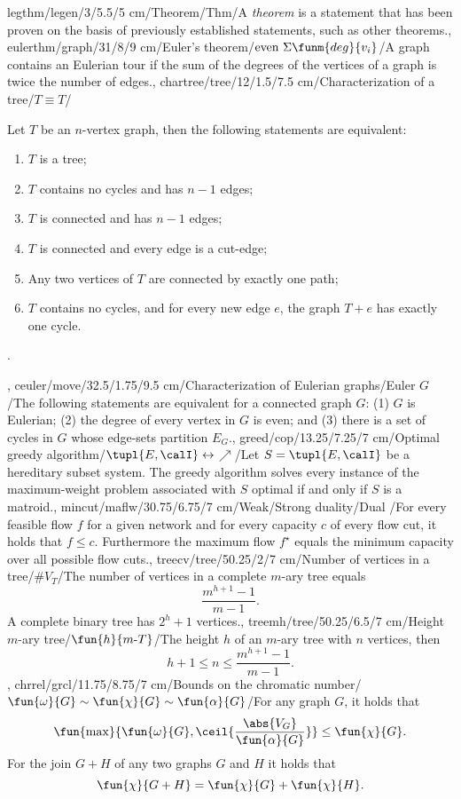 legthm/legen/3/5.5/5 cm/Theorem/Thm/{A \emph{theorem} is a statement that has been proven on the basis of previously established statements, such as other theorems.},
eulerthm/graph/31/8/9 cm/{Euler's theorem}/$\mbox{even}\ \Sigma{\funm{deg}{v_i}}$/{A graph contains an Eulerian tour if the sum of the degrees of the vertices of a graph is twice the number of edges.},
chartree/tree/12/1.5/7.5 cm/{Characterization of a tree}/{$T\equiv T$}/{Let $T$ be an $n$-vertex graph, then the following statements are equivalent:\begin{enumerate}\item $T$ is a tree; \item $T$ contains no cycles and has $n-1$ edges; \item $T$ is connected and has $n-1$ edges; \item $T$ is connected and every edge is a cut-edge; \item Any two vertices of $T$ are connected by exactly one path; \item $T$ contains no cycles, and for every new edge $e$, the graph $T+e$ has exactly one cycle.\end{enumerate}.},
ceuler/move/32.5/1.75/9.5 cm/{Characterization of Eulerian graphs}/{Euler $G$}/{The following statements are equivalent for a connected graph $G$: (1) $G$ is Eulerian; (2) the degree of every vertex in $G$ is even; and (3) there is a set of cycles in $G$ whose edge-sets partition $E_G$.},
greed/cop/13.25/7.25/7 cm/{Optimal greedy algorithm}/{$\tupl{E,\calI}\leftrightarrow$\textdollaroldstyle$\nearrow$}/{Let $S=\tupl{E,\calI}$ be a hereditary subset system. The greedy algorithm solves every instance of the maximum-weight problem associated with $S$ optimal if and only if $S$ is a matroid.},
mincut/maflw/30.75/6.75/7 cm/{Weak/Strong duality}/{Dual \watertap}/{For every feasible flow $f$ for a given network and for every capacity $c$ of every flow cut, it holds that $f\leq c$. Furthermore the maximum flow $f^{\star}$ equals the minimum capacity over all possible flow cuts.},
treecv/tree/50.25/2/7 cm/{Number of vertices in a tree}/{$\#V_T$}/{The number of vertices in a complete $m$-ary tree equals\[\dfrac{m^{h+1}-1}{m-1}.\] A complete binary tree has $2^h+1$ vertices.},
treemh/tree/50.25/6.5/7 cm/{Height $m$-ary tree}/{$\fun{h}{m\mbox{-}T}$}/{The height $h$ of an $m$-ary tree with $n$ vertices, then \[h+1\leq n\leq\dfrac{m^{h+1}-1}{m-1}.\]},
chrrel/grcl/11.75/8.75/7 cm/{Bounds on the chromatic number}/{$\fun{\omega}{G}\sim\fun{\chi}{G}\sim\fun{\alpha}{G}$}/{For any graph $G$, it holds that \[\fun{\max}{\fun{\omega}{G},\ceil{\dfrac{\abs{V_G}}{\fun{\alpha}{G}}}}\leq\fun{\chi}{G}.\] For the join $G+H$ of any two graphs $G$ and $H$ it holds that \[\fun{\chi}{G+H}=\fun{\chi}{G}+\fun{\chi}{H}.\]}